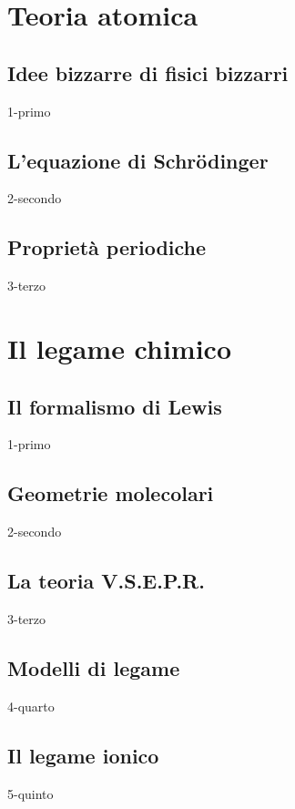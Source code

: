 \documentclass[openany,12pt]{book}%
\begin{document}
{\chapter{Teoria atomica}

\section{Idee bizzarre di fisici bizzarri}
{1-primo}

\section{L'equazione di Schrödinger}
{2-secondo}

\section{Proprietà periodiche}
{3-terzo}

\chapter{Il legame chimico}

\section{Il formalismo di Lewis}
{1-primo}

\newpage

\section{Geometrie molecolari}
{2-secondo}

\newpage

\section{La teoria V.S.E.P.R.}
{3-terzo}

\newpage

\section{Modelli di legame}
{4-quarto}

\newpage

\section{Il legame ionico}
{5-quinto}

}
\end{document}

